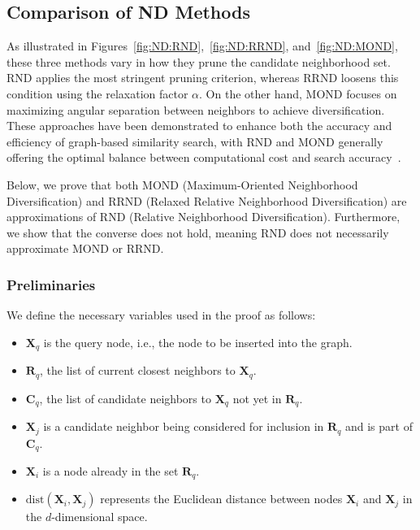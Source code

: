 \subsection{Comparison of ND Methods}
As illustrated in Figures~\ref{fig:ND:RND},~\ref{fig:ND:RRND}, and~\ref{fig:ND:MOND}, these three methods vary in how they prune the candidate neighborhood set. RND applies the most stringent pruning criterion, whereas RRND loosens this condition using the relaxation factor \(\alpha\). On the other hand, MOND focuses on maximizing angular separation between neighbors to achieve diversification. These approaches have been demonstrated to enhance both the accuracy and efficiency of graph-based similarity search, with RND and MOND generally offering the optimal balance between computational cost and search accuracy~\cite{gass}.

Below, we prove that both MOND (Maximum-Oriented Neighborhood Diversification) and RRND (Relaxed Relative Neighborhood Diversification) are approximations of RND (Relative Neighborhood Diversification). Furthermore, we show that the converse does not hold, meaning RND does not necessarily approximate MOND or RRND.

\subsubsection{Preliminaries}

We define the necessary variables used in the proof as follows:

\begin{itemize}
    \item \(\mathbf{X}_q\) is the query node, i.e., the node to be inserted into the graph.
    \item \(\mathbf{R}_q\), the list of current closest neighbors to \(\mathbf{X}_q\).
    \item \(\mathbf{C}_q\), the list of candidate neighbors to \(\mathbf{X}_q\) not yet in \(\mathbf{R}_q\).
    \item \(\mathbf{X}_j\) is a candidate neighbor being considered for inclusion in \(\mathbf{R}_q\) and is part of \(\mathbf{C}_q\).
    \item \(\mathbf{X}_i\) is a node already in the set \(\mathbf{R}_q\).
    \item \(\text{dist}(\mathbf{X}_i, \mathbf{X}_j)\) represents the Euclidean distance between nodes \(\mathbf{X}_i\) and \(\mathbf{X}_j\) in the \(d\)-dimensional space.
\end{itemize}

